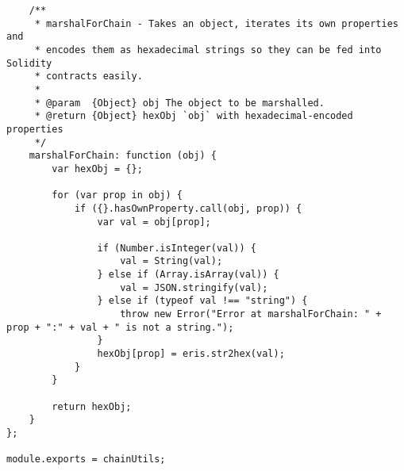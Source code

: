 \begin{lstlisting}
    /**
     * marshalForChain - Takes an object, iterates its own properties and
     * encodes them as hexadecimal strings so they can be fed into Solidity
     * contracts easily.
     *
     * @param  {Object} obj The object to be marshalled.
     * @return {Object} hexObj `obj` with hexadecimal-encoded properties
     */
    marshalForChain: function (obj) {
        var hexObj = {};

        for (var prop in obj) {
            if ({}.hasOwnProperty.call(obj, prop)) {
                var val = obj[prop];

                if (Number.isInteger(val)) {
                    val = String(val);
                } else if (Array.isArray(val)) {
                    val = JSON.stringify(val);
                } else if (typeof val !== "string") {
                    throw new Error("Error at marshalForChain: " + prop + ":" + val + " is not a string.");
                }
                hexObj[prop] = eris.str2hex(val);
            }
        }

        return hexObj;
    }
};

module.exports = chainUtils;
\end{lstlisting}
